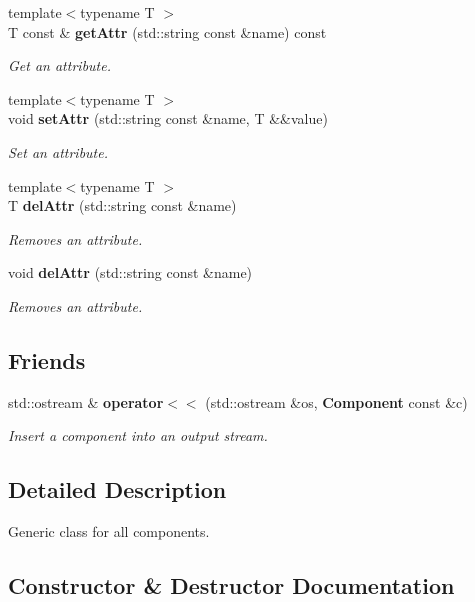 \begin{DoxyCompactItemize}
{\footnotesize template$<$typename T $>$ }\\T const  \& {\bf get\+Attr} (std\+::string const \&name) const
\begin{DoxyCompactList}\small\item\em Get an attribute. \end{DoxyCompactList}\item 
{\footnotesize template$<$typename T $>$ }\\void {\bf set\+Attr} (std\+::string const \&name, T \&\&value)
\begin{DoxyCompactList}\small\item\em Set an attribute. \end{DoxyCompactList}\item 
{\footnotesize template$<$typename T $>$ }\\T {\bf del\+Attr} (std\+::string const \&name)
\begin{DoxyCompactList}\small\item\em Removes an attribute. \end{DoxyCompactList}\item 
void {\bf del\+Attr} (std\+::string const \&name)
\begin{DoxyCompactList}\small\item\em Removes an attribute. \end{DoxyCompactList}\end{DoxyCompactItemize}
\subsection*{Friends}
\begin{DoxyCompactItemize}
\item 
std\+::ostream \& {\bf operator$<$$<$} (std\+::ostream \&os, {\bf Component} const \&c)
\begin{DoxyCompactList}\small\item\em Insert a component into an output stream. \end{DoxyCompactList}\end{DoxyCompactItemize}


\subsection{Detailed Description}
Generic class for all components. 

\subsection{Constructor \& Destructor Documentation}
\label{classentity__component__system_1_1component_1_1_component_ac862848295582fd4c902b2a6f2ef8a6b} 
